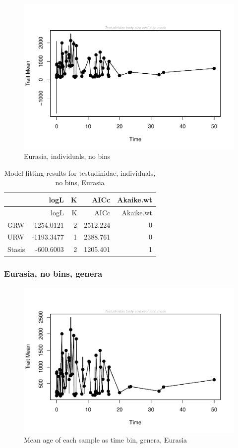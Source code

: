 \documentclass[]{article}
\begin{document}
\begin{figure}[htbp]
\centering
\includegraphics{MA_JJ_files/figure-latex/paleoTS, no bins individuals, Eurasia-1.pdf}
\caption{Eurasia, individuals, no bins}
\end{figure}

\begin{longtable}[]{@{}lrrrr@{}}
\caption{Model-fitting results for testudinidae, individuals, no bins,
Eurasia}\tabularnewline
\toprule
& logL & K & AICc & Akaike.wt\tabularnewline
\midrule
\endfirsthead
\toprule
& logL & K & AICc & Akaike.wt\tabularnewline
\midrule
\endhead
GRW & -1254.0121 & 2 & 2512.224 & 0\tabularnewline
URW & -1193.3477 & 1 & 2388.761 & 0\tabularnewline
Stasis & -600.6003 & 2 & 1205.401 & 1\tabularnewline
\bottomrule
\end{longtable}

\newpage 

\subsubsection{Eurasia, no bins, genera}\label{eurasia-no-bins-genera}

\begin{figure}[htbp]
\centering
\includegraphics{MA_JJ_files/figure-latex/paleoTS with different time bins, no bins, genera, Eurasia-1.pdf}
\caption{Mean age of each sample as time bin, genera, Eurasia}
\end{figure}
\end{document}
